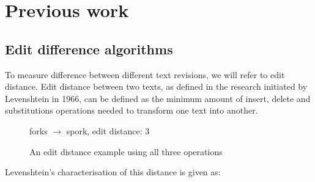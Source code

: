 \documentclass[a4paper,11pt,twoside,notitlepage]{article}
\newcommand\CellText[2]{%
          \node[texto,left=of mat#1,anchor=east]
          at (mat#1.west)
          {\large #2};
        }
\newcommand\SlText[2]{%
          \node[texto,left=of mat#1,anchor=west,rotate=50]
          at ([xshift=1.5ex,yshift=1ex]mat#1.north)
          {\large #2};
        }
\begin{document}
        \section{Previous work}
        \subsection{Edit difference algorithms}
        To measure difference between different text revisions, we
        will refer to edit distance. Edit distance between two texts,
        as defined in the research initiated by Levenshtein in
        1966,\cite{Levenshtein1966} can be defined as the minimum
        amount of insert, delete and substitutions operations needed
        to transform one text into another.

        \begin{figure}[H]
          \centering
                  

          \vspace{3 mm}

          forks $\rightarrow$ spork, edit distance: 3
          
          \caption{An edit distance example using all three operations}
          \label{fig:fork-spork}
        \end{figure}

        Levenshtein's characterisation of this distance is given as:
        
\end{document}
